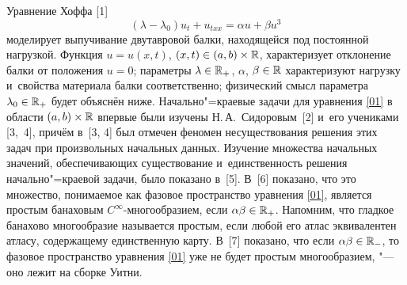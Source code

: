 


\date{15/VII/2009} %



\maketitle


Уравнение Хоффа [1] \begin{equation}
\label{01}(\lambda -\lambda_0)u_t+u_{txx}=\alpha u+ \beta u^3
\end{equation}
моделирует выпучивание двутавровой балки, находящейся под постоянной нагрузкой. 
Функция $u=u(x, t)$, $(x, t)\in (a, b)\times {\Bbb R}$, характеризует отклонение балки от положения $u=0$; 
параметры $\lambda\in\Bbb R_+$, $\alpha$, $\beta\in \Bbb R$ характеризуют нагрузку и~свойства материала балки соответственно; 
физический смысл параметра $\lambda_0\in\Bbb R_+$ будет объяснён ниже. 
Начально"=краевые задачи для уравнения \eqref{01} в области $(a, b)\times \Bbb R$ впервые были изучены Н.\,А.~Сидоровым~[2] и~его учениками [3,~4], причём в~[3, 4] был отмечен феномен несуществования решения этих задач при произвольных начальных данных. 
Изучение множества начальных значений, обеспечивающих существование и~единственность решения начально"=краевой задачи, было показано в~[5]. В~[6] показано, что это множество, понимаемое как фазовое пространство уравнения \eqref{01}, является простым банаховым $C^\infty$-многообразием, если $\alpha\beta\in\Bbb R_+$. Напомним, что гладкое банахово многообразие называется простым, если любой его атлас эквивалентен атласу, содержащему единственную карту. 
В~[7] показано, что если $\alpha\beta\in\Bbb R_-$, то фазовое пространство уравнения \eqref{01} уже не будет простым многообразием, "--- оно лежит на сборке Уитни.

